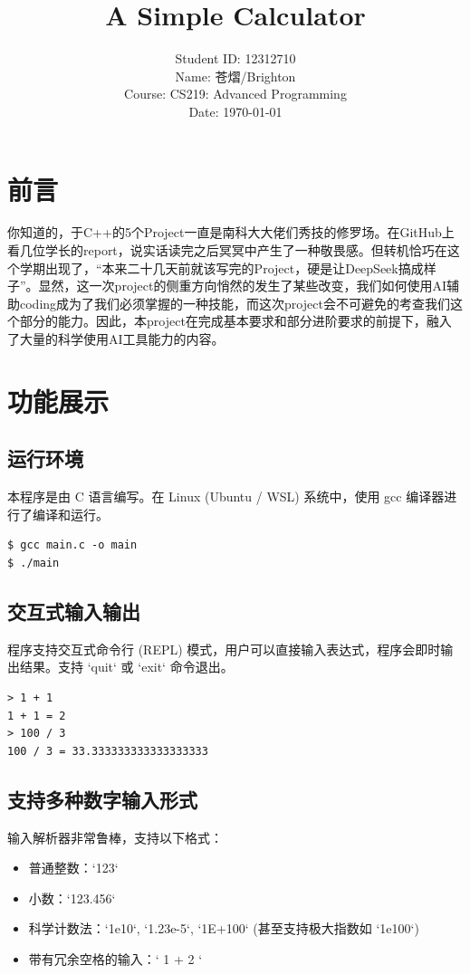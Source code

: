 \documentclass[UTF8]{ctexart}
\title{\textbf{A Simple Calculator}}
\author{
    Student ID: 12312710 \\
    Name: 苍熠/Brighton \\
    Course: CS219: Advanced Programming \\
    Date: \today
}
\date{}
\begin{document}
\maketitle
\tableofcontents
\newpage

\section{前言}
你知道的，于C++的5个Project一直是南科大大佬们秀技的修罗场。在GitHub上看几位学长的report，说实话读完之后冥冥中产生了一种敬畏感。但转机恰巧在这个学期出现了，“本来二十几天前就该写完的Project，硬是让DeepSeek搞成样子”。显然，这一次project的侧重方向悄然的发生了某些改变，我们如何使用AI辅助coding成为了我们必须掌握的一种技能，而这次project会不可避免的考查我们这个部分的能力。因此，本project在完成基本要求和部分进阶要求的前提下，融入了大量的科学使用AI工具能力的内容。

\section{功能展示}

\subsection{运行环境}
本程序是由 C 语言编写。在 Linux (Ubuntu / WSL) 系统中，使用 gcc 编译器进行了编译和运行。
\begin{verbatim}
$ gcc main.c -o main
$ ./main
\end{verbatim}

\subsection{交互式输入输出}
程序支持交互式命令行 (REPL) 模式，用户可以直接输入表达式，程序会即时输出结果。支持 `quit` 或 `exit` 命令退出。
\begin{verbatim}
> 1 + 1
1 + 1 = 2
> 100 / 3
100 / 3 = 33.333333333333333333
\end{verbatim}

\subsection{支持多种数字输入形式}
输入解析器非常鲁棒，支持以下格式：
\begin{itemize}
    \item 普通整数：`123`
    \item 小数：`123.456`
    \item 科学计数法：`1e10`, `1.23e-5`, `1E+100` (甚至支持极大指数如 `1e100`)
    \item 带有冗余空格的输入：`  1   +   2  `
\end{itemize}
\end{document}
